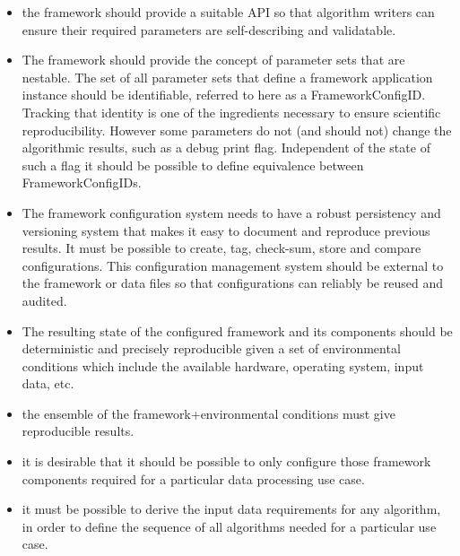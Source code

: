 \documentclass[../main-v1.tex]{subfiles}
\begin{document}
\begin{itemize}
\item the framework should provide a suitable API so that algorithm writers can ensure their required parameters are self-describing and validatable.

\item The framework should provide the concept of parameter sets that are nestable.  The set of all parameter sets that define a framework application instance should be identifiable, referred to here as a FrameworkConfigID.  Tracking that identity is one of the ingredients necessary to ensure scientific reproducibility.  However some parameters do not (and should not) change the algorithmic results, such as a debug print flag.  Independent of the state of such a flag it should be possible to define equivalence between FrameworkConfigIDs.

\item The framework configuration system needs to have a robust persistency and versioning system that makes it easy to document and reproduce previous results.  It must be possible to create, tag, check-sum, store and compare configurations.  This configuration management system should be external to the framework or data files so that configurations can reliably be reused and audited.  


\item The resulting state of the configured framework and its components should be deterministic and precisely reproducible given a set of environmental conditions which include the available hardware, operating system, input data, etc.  

\item the ensemble of the framework+environmental conditions must give reproducible results.  


\item it is desirable that it should be possible to only configure those framework components required for a particular data processing use case.  


\item it must be possible to derive the input data requirements for any algorithm, in order to define the sequence of all algorithms needed for a particular use case.
\end{itemize}
 
\end{document}
